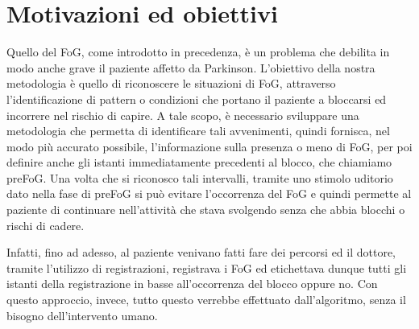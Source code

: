 


\chapter{Motivazioni ed obiettivi}\label{chap4:Goals}
Quello del FoG, come introdotto in precedenza, è un problema che debilita in modo anche grave il paziente affetto da Parkinson. L'obiettivo della nostra metodologia è quello di riconoscere le situazioni di FoG, attraverso l'identificazione di pattern o condizioni che portano il paziente a bloccarsi ed incorrere nel rischio di capire. A tale scopo, è necessario sviluppare una metodologia che permetta di identificare tali avvenimenti, quindi fornisca, nel modo più accurato possibile, l'informazione sulla presenza o meno di FoG, per poi definire anche gli istanti immediatamente precedenti al blocco, che chiamiamo preFoG. Una volta che si riconosco tali intervalli, tramite uno stimolo uditorio dato nella fase di preFoG si può evitare l'occorrenza del FoG e quindi permette al paziente di continuare nell'attività che stava svolgendo senza che abbia blocchi o rischi di cadere.\\
%

Infatti, fino ad adesso, al paziente venivano fatti fare dei percorsi ed il dottore, tramite l'utilizzo di registrazioni, registrava i FoG ed etichettava dunque tutti gli istanti della registrazione in basse all'occorrenza del blocco oppure no. Con questo approccio, invece, tutto questo verrebbe effettuato dall'algoritmo, senza il bisogno dell'intervento umano.\\
